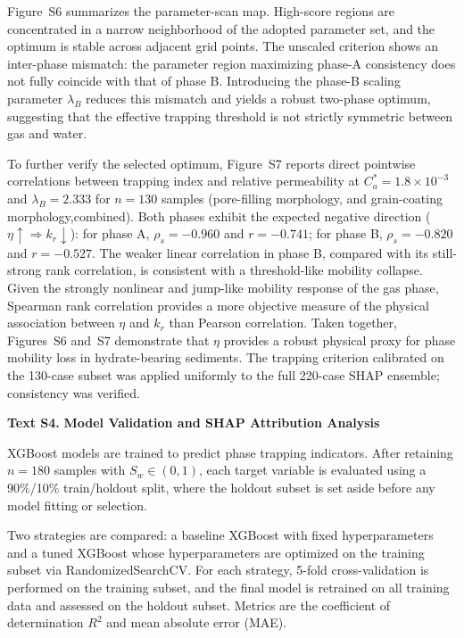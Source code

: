 \documentclass[draft,wrr]{agutexSI2019}
\begin{document}
\begin{article}
Figure~S6 summarizes the parameter-scan map. High-score regions are concentrated
in a narrow neighborhood of the adopted parameter set, and the optimum is stable
across adjacent grid points. The unscaled criterion shows an inter-phase mismatch:
the parameter region maximizing phase-A consistency does not fully coincide with
that of phase B. Introducing the phase-B scaling parameter $\lambda_B$ reduces
this mismatch and yields a robust two-phase optimum, suggesting that the effective
trapping threshold is not strictly symmetric between gas and water.

To further verify the selected optimum, Figure~S7 reports direct pointwise
correlations between trapping index and relative permeability at
$C_a^* = 1.8 \times 10^{-3}$ and $\lambda_B = 2.333$ for $n=130$ samples
(pore-filling morphology, and grain-coating morphology,combined). Both phases exhibit the expected negative
direction ($\eta \uparrow \Rightarrow k_r \downarrow$): for phase A,
$\rho_s=-0.960$ and $r=-0.741$; for phase B, $\rho_s=-0.820$ and $r=-0.527$.
The weaker linear correlation in phase B, compared with its still-strong rank
correlation, is consistent with a threshold-like mobility collapse. Given the
strongly nonlinear and jump-like mobility response of the gas phase, Spearman
rank correlation provides a more objective measure of the physical association
between $\eta$ and $k_r$ than Pearson correlation. Taken together,
Figures~S6 and~S7 demonstrate that $\eta$ provides a robust physical proxy for
phase mobility loss in hydrate-bearing sediments.
The trapping criterion calibrated on the 130-case subset
was applied uniformly to the full 220-case
SHAP ensemble; consistency was verified.

\noindent\textbf{Text S4.}
\textbf{Model Validation and SHAP Attribution Analysis}

XGBoost models are trained to predict phase trapping indicators.
After retaining $n=180$ samples with $S_w\in(0,1)$, each target variable
is evaluated using a 90\%/10\% train/holdout split, where the holdout
subset is set aside before any model fitting or selection.

Two strategies are compared: a baseline XGBoost with fixed hyperparameters
and a tuned XGBoost whose hyperparameters are optimized on the training
subset via RandomizedSearchCV\@. For each strategy, 5-fold cross-validation
is performed on the training subset, and the final model is retrained on
all training data and assessed on the holdout subset.
Metrics are the coefficient of determination $R^2$ and mean absolute
error (MAE).


\end{article}
\end{document}
